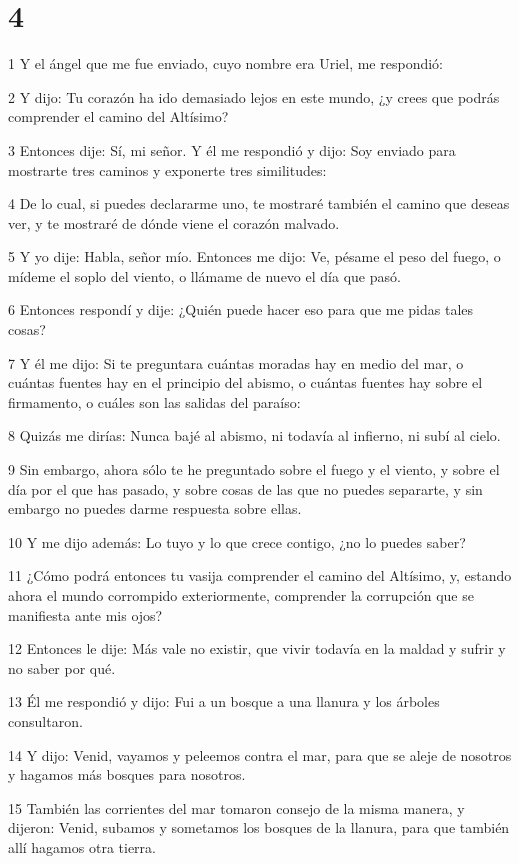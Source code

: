 \chapter{4}

\par 1 Y el ángel que me fue enviado, cuyo nombre era Uriel, me respondió:
\par 2 Y dijo: Tu corazón ha ido demasiado lejos en este mundo, ¿y crees que podrás comprender el camino del Altísimo?
\par 3 Entonces dije: Sí, mi señor. Y él me respondió y dijo: Soy enviado para mostrarte tres caminos y exponerte tres similitudes:
\par 4 De lo cual, si puedes declararme uno, te mostraré también el camino que deseas ver, y te mostraré de dónde viene el corazón malvado.
\par 5 Y yo dije: Habla, señor mío. Entonces me dijo: Ve, pésame el peso del fuego, o mídeme el soplo del viento, o llámame de nuevo el día que pasó.
\par 6 Entonces respondí y dije: ¿Quién puede hacer eso para que me pidas tales cosas?
\par 7 Y él me dijo: Si te preguntara cuántas moradas hay en medio del mar, o cuántas fuentes hay en el principio del abismo, o cuántas fuentes hay sobre el firmamento, o cuáles son las salidas del paraíso:
\par 8 Quizás me dirías: Nunca bajé al abismo, ni todavía al infierno, ni subí al cielo.
\par 9 Sin embargo, ahora sólo te he preguntado sobre el fuego y el viento, y sobre el día por el que has pasado, y sobre cosas de las que no puedes separarte, y sin embargo no puedes darme respuesta sobre ellas.
\par 10 Y me dijo además: Lo tuyo y lo que crece contigo, ¿no lo puedes saber?
\par 11 ¿Cómo podrá entonces tu vasija comprender el camino del Altísimo, y, estando ahora el mundo corrompido exteriormente, comprender la corrupción que se manifiesta ante mis ojos?
\par 12 Entonces le dije: Más vale no existir, que vivir todavía en la maldad y sufrir y no saber por qué.
\par 13 Él me respondió y dijo: Fui a un bosque a una llanura y los árboles consultaron.
\par 14 Y dijo: Venid, vayamos y peleemos contra el mar, para que se aleje de nosotros y hagamos más bosques para nosotros.
\par 15 También las corrientes del mar tomaron consejo de la misma manera, y dijeron: Venid, subamos y sometamos los bosques de la llanura, para que también allí hagamos otra tierra.

